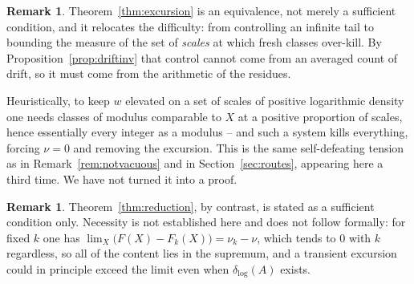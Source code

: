 \documentclass[11pt]{article}
\theoremstyle{plain}
\theoremstyle{definition}
\newtheorem{remark}[theorem]{Remark}
\newcommand{\dlog}{\delta_{\log}}
\begin{document}
\begin{remark}
Theorem~\ref{thm:excursion} is an equivalence, not merely a
sufficient condition, and it relocates the difficulty: from controlling an infinite tail
to bounding the measure of the set of \emph{scales} at which
fresh classes over-kill.  By
Proposition~\ref{prop:driftinv} that control cannot come from
an averaged count of drift, so it must come from the arithmetic
of the residues.

Heuristically, to keep $w$ elevated on a set of
scales of positive logarithmic density one needs classes of
modulus comparable to $X$ at a positive proportion of scales,
hence essentially every integer as a modulus -- and such a
system kills everything, forcing $\nu=0$ and removing the
excursion.  This is the same self-defeating tension as in
Remark~\ref{rem:notvacuous} and in Section~\ref{sec:routes}, appearing here a
third time.  We have not turned it into a proof.
\end{remark}

\begin{remark}
Theorem~\ref{thm:reduction}, by contrast, is stated as a
sufficient condition only.  Necessity is not established here and does not follow formally: for fixed $k$ one
has $\lim_{X}\bigl(F(X)-F_k(X)\bigr)=\nu_k-\nu$, which tends to
$0$ with $k$ regardless, so all of the content lies in the
supremum, and a transient excursion could in principle exceed
the limit even when $\dlog(A)$ exists.
\end{remark}
\end{document}

